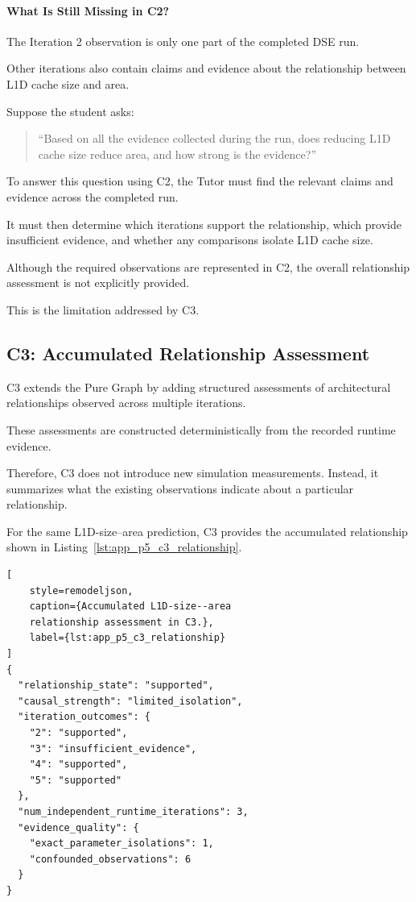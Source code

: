 \paragraph{What Is Still Missing in C2?}

The Iteration 2 observation
is only one part of the
completed DSE run.

Other iterations also contain
claims and evidence about
the relationship between
L1D cache size and area.

Suppose the student asks:

\begin{quote}
``Based on all the evidence
collected during the run,
does reducing L1D cache size
reduce area, and how strong
is the evidence?''
\end{quote}

To answer this question using C2,
the Tutor must find the relevant
claims and evidence across
the completed run.

It must then determine which
iterations support the relationship,
which provide insufficient evidence,
and whether any comparisons
isolate L1D cache size.

Although the required observations
are represented in C2,
the overall relationship assessment
is not explicitly provided.

This is the limitation
addressed by C3.


\subsection{C3: Accumulated Relationship Assessment}

C3 extends the Pure Graph
by adding structured assessments
of architectural relationships
observed across multiple iterations.

These assessments are constructed
deterministically from the recorded
runtime evidence.

Therefore, C3 does not introduce
new simulation measurements.
Instead, it summarizes what
the existing observations indicate
about a particular relationship.

For the same L1D-size--area
prediction, C3 provides
the accumulated relationship
shown in
Listing~\ref{lst:app_p5_c3_relationship}.

\begin{lstlisting}[
    style=remodeljson,
    caption={Accumulated L1D-size--area
    relationship assessment in C3.},
    label={lst:app_p5_c3_relationship}
]
{
  "relationship_state": "supported",
  "causal_strength": "limited_isolation",
  "iteration_outcomes": {
    "2": "supported",
    "3": "insufficient_evidence",
    "4": "supported",
    "5": "supported"
  },
  "num_independent_runtime_iterations": 3,
  "evidence_quality": {
    "exact_parameter_isolations": 1,
    "confounded_observations": 6
  }
}
\end{lstlisting}

